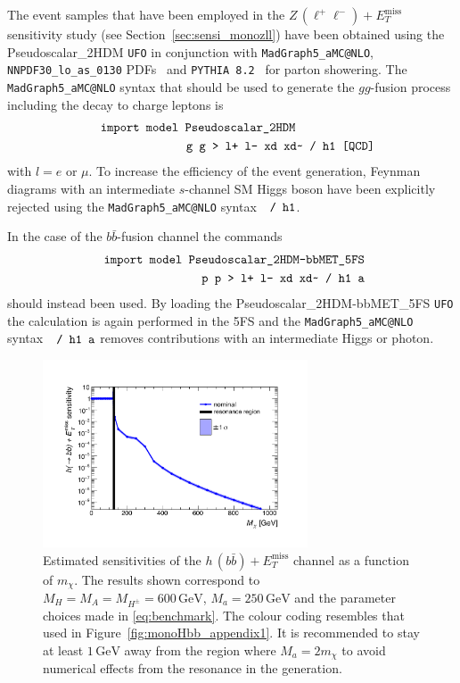 \documentclass[review]{elsarticle}
\newcommand{\MET}{\ensuremath{E_T^\mathrm{miss}}\xspace}
\newcommand{\mA}{\ensuremath{M_{A}}\xspace}
\newcommand{\ma}{\ensuremath{M_{a}}\xspace}
\newcommand{\mH}{\ensuremath{M_{H}}\xspace}
\newcommand{\mHc}{\ensuremath{M_{H^{\pm}}}\xspace}
\begin{document}
The event samples that have been employed in the $Z \, (\ell^+ \ell^-) + \MET$ sensitivity study (see Section~\ref{sec:sensi_monozll}) have been obtained using the Pseudoscalar\_2HDM {\tt UFO} in conjunction with {\tt MadGraph5\_aMC@NLO}, {\tt NNPDF30\_lo\_as\_0130} PDFs~\cite{Ball:2014uwa} and  {\tt PYTHIA~8.2}~\cite{Sjostrand:2014zea} for parton showering.  The {\tt MadGraph5\_aMC@NLO}  syntax that should be used to generate the $gg$-fusion process including the decay to charge leptons is 
\begin{eqnarray}
&& \verb| import model Pseudoscalar_2HDM | \hspace{2.25cm} \nonumber \\
&& \verb| g g > l+ l- xd xd~ / h1 [QCD] | \nonumber 
\end{eqnarray}
with $l = e$ or $\mu$.  To increase the efficiency of the event generation, Feynman diagrams with an intermediate $s$-channel SM Higgs boson have been explicitly rejected using the  {\tt MadGraph5\_aMC@NLO} syntax~~$\verb|/ h1|$. 

In the case of the $b \bar b$-fusion channel the commands 
\begin{eqnarray}
&& \verb| import model Pseudoscalar_2HDM-bbMET_5FS  | \nonumber \\
&& \verb| p p > l+ l- xd xd~ / h1 a  | \nonumber 
\end{eqnarray}
should instead been used.  By loading the Pseudoscalar\_2HDM-bbMET\_5FS  {\tt UFO}  the calculation is again performed in the 5FS and the  {\tt MadGraph5\_aMC@NLO} syntax~~$\verb|/ h1 a|$ removes contributions with an intermediate Higgs or photon.  

\begin{figure}[t!]
\centering
\includegraphics[width=0.7\textwidth]{monoHbb_sensi_mDM_scan_red.pdf}
\vspace{-2mm}
\caption{Estimated sensitivities of  the $h \, (b \bar b)+\MET$ channel as a function of $m_\chi$. The  results shown correspond to $\mH = \mA = \mHc = 600 \, {\mathrm{GeV}}$, $\ma = 250 \, {\mathrm{GeV}}$ and the parameter choices made in \eqref{eq:benchmark}. The colour coding resembles that used in Figure~\ref{fig:monoHbb_appendix1}. It is recommended to stay at least $1 \, {\mathrm{GeV}}$ away from the region where $\ma = 2 m_\chi$ to avoid numerical effects from the resonance in the generation. }
\label{fig:monoHbb_appendix2}
\end{figure}
\end{document}
